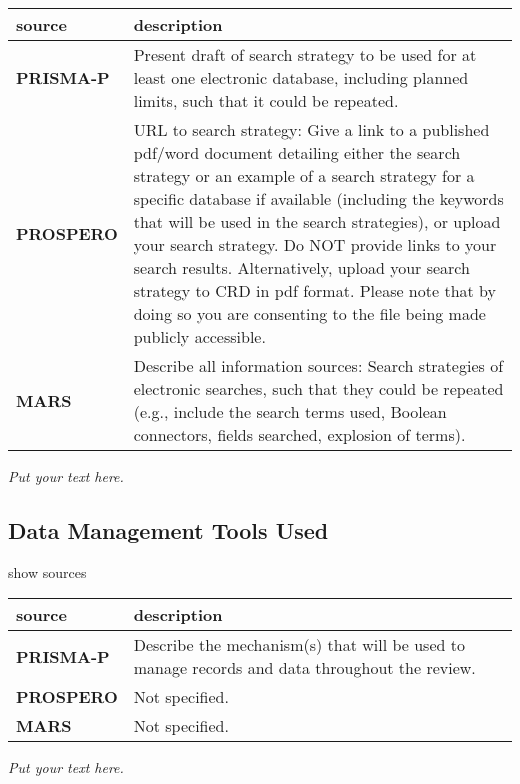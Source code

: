 \documentclass[]{article}
\begin{document}
\hypertarget{searchs}{}
\begin{table}[H]
\centering
\begin{tabular}{>{\bfseries}l|l}
\hline
\rowcolor[HTML]{ececec}  source & description\\
\hline
PRISMA-P & Present draft of search strategy to be used for at least one electronic database, including planned limits, such that it could be repeated.\\
\hline
PROSPERO & URL to search strategy: Give a link to a published pdf/word document detailing either the search strategy or an example of a search strategy for a specific database if available (including the keywords that will be used in the search strategies), or upload your search strategy. Do NOT provide links to your search results. Alternatively, upload your search strategy to CRD in pdf format. Please note that by doing so you are consenting to the file being made publicly accessible.\\
\hline
MARS & Describe all information sources: Search strategies of electronic searches, such that they could be repeated (e.g., include the search terms used, Boolean connectors, fields searched, explosion of terms).\\
\hline
\end{tabular}
\end{table}

\emph{Put your text here.}

\hypertarget{data-management-tools-used}{%
\subsection{Data Management Tools
Used}\label{data-management-tools-used}}

show sources

\hypertarget{dmtu}{}
\begin{table}[H]
\centering
\begin{tabular}{>{\bfseries}l|l}
\hline
\rowcolor[HTML]{ececec}  source & description\\
\hline
PRISMA-P & Describe the mechanism(s) that will be used to manage records and data throughout the review.\\
\hline
PROSPERO & Not specified.\\
\hline
MARS & Not specified.\\
\hline
\end{tabular}
\end{table}

\emph{Put your text here.}
\end{document}
